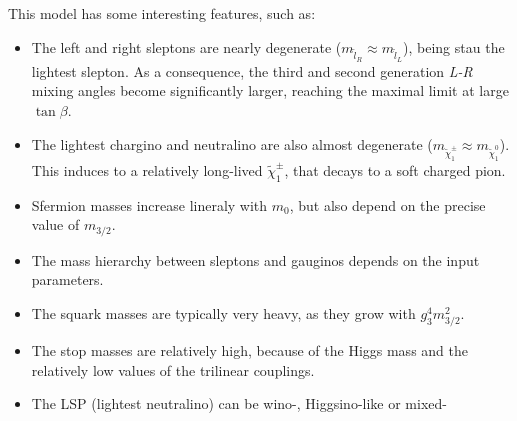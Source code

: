 This model has some interesting features, such as:
\begin{itemize}
\item The left and right sleptons are nearly degenerate ($m_{\tilde{l}_R} \approx m_{\tilde{l}_L}$), being stau the lightest slepton. As a consequence, the third and second generation \textit{L-R} mixing angles become significantly larger, reaching the maximal limit at large $\tan{\beta}$.
\item The lightest chargino and neutralino are also almost degenerate ($m_{\tilde{\chi}_1^{\pm}} \approx m_{\tilde{\chi}_1^0}$). This induces to a relatively long-lived $\tilde{\chi}_1^{\pm}$, that decays to a soft charged pion. 
\item Sfermion masses increase lineraly with $m_0$, but also depend on the precise value of $m_{3/2}$.
\item The mass hierarchy between sleptons and gauginos depends on the input parameters.
\item The squark masses are typically very heavy, as they grow with $g_3^4m_{3/2}^2$.
\item The stop masses are relatively high, because of the Higgs mass and the relatively low values of the trilinear couplings.
\item The LSP (lightest neutralino) can be wino-, Higgsino-like or mixed-
\end{itemize}

